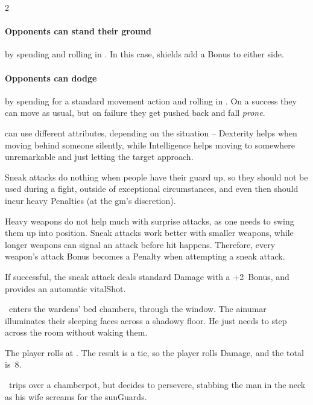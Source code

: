 \begin{multicols}{2}
\paragraph{Opponents can stand their ground}
by spending  and rolling  in .
In this case, shields add a Bonus to either side.

\paragraph{Opponents can dodge}
by spending  for a standard movement \gls{action} and rolling  in .
On a success they can move as usual, but on failure they get pushed back and fall \textit{prone}.

\retreatCommentary[t]

\label{sneakattack}
can use different \glspl{attribute}, depending on the situation -- Dexterity helps when moving behind someone silently, while Intelligence helps moving to somewhere unremarkable and just letting the target approach.

Sneak attacks do nothing when people have their guard up, so they should not be used during a fight, outside of exceptional circumstances, and even then should incur heavy Penalties (at the \gls{gm}'s discretion).

Heavy weapons do not help much with surprise attacks, as one needs to swing them up into position.
Sneak attacks work better with smaller weapons, while longer weapons can signal an attack before hit happens.
Therefore, every weapon's attack Bonus becomes a Penalty when attempting a sneak attack.

If successful, the sneak attack deals standard Damage with a +2~Bonus, and provides an automatic \gls{vitalShot}.

\begin{exampletext}
  \composeHumanName\ enters the \glspl{warden}' bed chambers, through the
  window.  The \gls{ainumar} illuminates their sleeping faces across a shadowy
  floor.  He just needs to step across the room without waking them.

  {\sffamily The player rolls  at \tn[7].  The result
  is a tie, so the player rolls Damage, and the total is~8.}

  \currentName\ trips over a chamberpot, but decides to persevere, stabbing the
  man in the neck as his wife screams for the \glspl{sunGuard}.
\end{exampletext}


\end{multicols}
